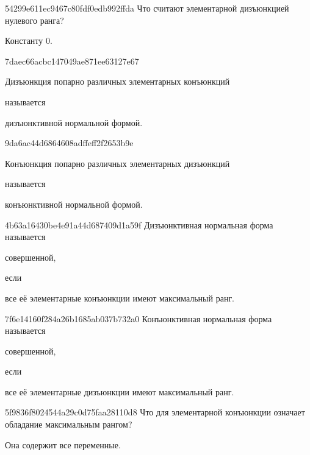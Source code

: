 \begin{note}{54299e611ec9467c80fdf0edb992ffda}
    Что считают элементарной дизъюнкцией нулевого ранга?

    \begin{cloze}{1}
        Константу \({ 0 }\).
    \end{cloze}
\end{note}

\begin{note}{7daec66acbc147049ae871ee63127e67}
    \begin{icloze}{1}Дизъюнкция попарно различных элементарных конъюнкций\end{icloze} называется \begin{icloze}{2}дизъюнктивной нормальной формой.\end{icloze}
\end{note}

\begin{note}{9da6ac44d6864608adffeff2f2653b9e}
    \begin{icloze}{1}Конъюнкция попарно различных элементарных дизъюнкций\end{icloze} называется \begin{icloze}{2}конъюнктивной нормальной формой.\end{icloze}
\end{note}

\begin{note}{4b63a16430be4e91a44d687409d1a59f}
    Дизъюнктивная нормальная форма называется \begin{icloze}{2}совершенной,\end{icloze} если \begin{icloze}{1}все её элементарные конъюнкции имеют максимальный ранг.\end{icloze}
\end{note}

\begin{note}{7f6e14160f284a26b1685ab037b732a0}
    Конъюнктивная нормальная форма называется \begin{icloze}{2}совершенной,\end{icloze} если \begin{icloze}{1}все её элементарные дизъюнкции имеют максимальный ранг.\end{icloze}
\end{note}

\begin{note}{5f9836f8024544a29c0d75faa28110d8}
    Что для элементарной конъюнкции означает обладание максимальным рангом?

    \begin{cloze}{1}
        Она содержит все переменные.
    \end{cloze}
\end{note}

